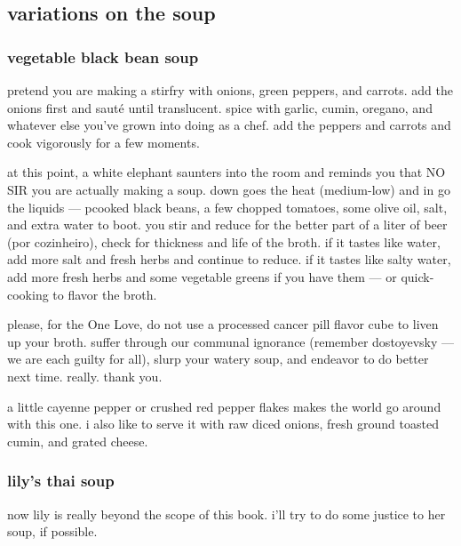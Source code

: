 \subsection{variations on the soup}

\subsubsection{vegetable black bean soup}

pretend you are making a stirfry with onions, green peppers, and
carrots. add the onions first and saut\'{e} until translucent. spice
with garlic, cumin, oregano, and whatever else you've grown into doing
as a chef. add the peppers and carrots and cook vigorously for a few
moments.

at this point, a white elephant saunters into the room and reminds you
that NO SIR you are actually making a soup. down goes the heat
(medium-low) and in go the liquids --- pcooked black beans, a few
chopped tomatoes, some olive oil, salt, and extra water to boot. you
stir and reduce for the better part of a liter of beer (\gls{por
cozinheiro}), check for
thickness and life of the broth. if it tastes like water, add more
salt and fresh herbs and continue to reduce. if it tastes like salty
water, add more fresh herbs and some vegetable greens if you have them
--- or  quick-cooking to flavor the broth.

please, for the One Love, do not use a processed cancer pill flavor
cube to liven up your broth. suffer through our communal ignorance
(remember dostoyevsky --- we are each guilty for all), slurp your
watery soup, and endeavor to do better next time. really. thank you.

a little cayenne pepper or crushed red pepper flakes makes the world
go around with this one. i also like to serve it with raw diced
onions, fresh ground toasted cumin, and grated cheese.

\subsubsection{lily's thai soup}

now lily is really beyond the scope of this book. i'll try to do some
justice to her soup, if possible.

